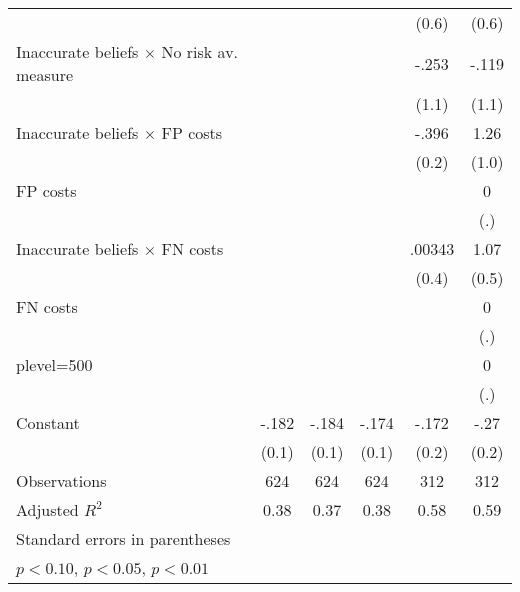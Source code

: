 \begin{table}[htbp]
\begin{tabular}{l*{5}{c}}
                &                  &                  &                  &    (0.6)         &    (0.6)         \\
Inaccurate beliefs $\times$ No risk av. measure&                  &                  &                  &    -.253         &    -.119         \\
                &                  &                  &                  &    (1.1)         &    (1.1)         \\
Inaccurate beliefs $\times$ FP costs&                  &                  &                  &    -.396\sym{*}  &     1.26         \\
                &                  &                  &                  &    (0.2)         &    (1.0)         \\
FP costs        &                  &                  &                  &                  &        0         \\
                &                  &                  &                  &                  &      (.)         \\
Inaccurate beliefs $\times$ FN costs&                  &                  &                  &   .00343         &     1.07\sym{**} \\
                &                  &                  &                  &    (0.4)         &    (0.5)         \\
FN costs        &                  &                  &                  &                  &        0         \\
                &                  &                  &                  &                  &      (.)         \\
plevel=500      &                  &                  &                  &                  &        0         \\
                &                  &                  &                  &                  &      (.)         \\
Constant        &    -.182\sym{**} &    -.184\sym{**} &    -.174\sym{**} &    -.172         &     -.27         \\
                &    (0.1)         &    (0.1)         &    (0.1)         &    (0.2)         &    (0.2)         \\
\hline
Observations    &      624         &      624         &      624         &      312         &      312         \\
Adjusted \(R^{2}\)&     0.38         &     0.37         &     0.38         &     0.58         &     0.59         \\
\hline\hline
\multicolumn{6}{l}{\footnotesize Standard errors in parentheses}\\
\multicolumn{6}{l}{\footnotesize \sym{*} \(p<0.10\), \sym{**} \(p<0.05\), \sym{***} \(p<0.01\)}\\
\end{tabular}
\end{table}
